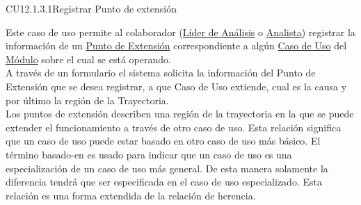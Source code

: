 	\begin{UseCase}{CU12.1.3.1}{Registrar Punto de extensión}{
			
			Este caso de uso permite al colaborador (\hyperlink{jefe}{Líder de Análisis} o \hyperlink{analista}{Analista}) registrar la información de un \hyperlink{entidadExtension}{Punto de Extensión} correspondiente a algún \hyperlink{casoUso}{Caso de Uso} del \hyperlink{moduloEntidad}{Módulo} sobre el cual se está operando.\\
			
			A través de un formulario el sistema solicita la información del Punto de Extensión que se desea registrar, a que Caso de Uso extiende, cual es la causa y por último la región de la Trayectoria.\\
			
			Los puntos de extensión describen una región de la trayectoria en la que se puede extender el funcionamiento a través de otro caso de uso. Esta relación significa que un caso de uso puede estar basado en otro caso de uso más básico. El término basado-en es usado para indicar que un caso de uso es una especialización de un caso de uso más general. De esta manera solamente la diferencia tendrá que ser especificada en el caso de uso especializado. Esta relación es una forma extendida de la relación de herencia.\\
			
}
\end{UseCase}
